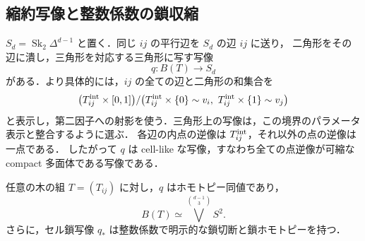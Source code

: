 \subsection{縮約写像と整数係数の鎖収縮}

$S_d=\operatorname{Sk}_2\Delta^{d-1}$ と置く．同じ $ij$ の平行辺を $S_d$ の辺 $ij$ に送り，
二角形をその辺に潰し，三角形を対応する三角形に写す写像
\[
 q:B(T)\longrightarrow S_d
\]
がある．より具体的には，$ij$ の全ての辺と二角形の和集合を
\[
 \bigl(T_{ij}^{\rm int}\times[0,1]\bigr)/
 \bigl(T_{ij}^{\rm int}\times\{0\}\sim v_i,\ 
 T_{ij}^{\rm int}\times\{1\}\sim v_j\bigr)
\]
と表示し，第二因子への射影を使う．三角形上の写像は，この境界のパラメータ表示と整合するように選ぶ．
各辺の内点の逆像は $T_{ij}^{\rm int}$，それ以外の点の逆像は一点である．
したがって $q$ は cell-like な写像，すなわち全ての点逆像が可縮な compact 多面体である写像である．

\begin{theorem}\label{topo:sdr}
任意の木の組 $T=(T_{ij})$ に対し，$q$ はホモトピー同値であり，
\[
 B(T)\simeq\bigvee^{\binom{d-1}{3}}S^2.
\]
さらに，セル鎖写像 $q_*$ は整数係数で明示的な鎖切断と鎖ホモトピーを持つ．
\end{theorem}

